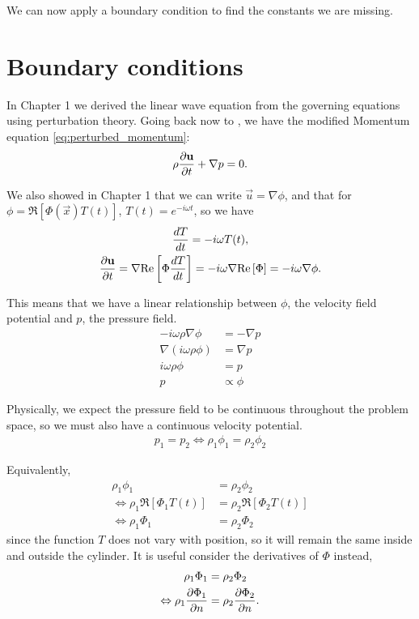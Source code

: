 We can now apply a boundary condition to find the constants we are missing.
%
%
\section{Boundary conditions}

In Chapter 1 we derived the linear wave equation from the governing equations using perturbation theory. Going back now to , we have the modified Momentum equation \eqref{eq:perturbed_momentum}:
\begin{equation*}
  \rho \frac{\partial \mathbf{u}}{\partial t} + \nabla p = 0.
\end{equation*}

We also showed in Chapter 1 that we can write $\vec{u} = \nabla \phi$, and that for $\phi = \Re[\Phi(\vec{x})T(t)]$, $T(t)=e^{-i\omega t}$, so we have
\begin{gather*}
  \frac{dT}{dt} = - i\omega T(t), \\
  \frac{\partial \mathbf{u}}{\partial t} = \nabla \text{Re}\left[\Phi \frac{dT}{dt} \right]
  = -i \omega \nabla \text{Re}\left[ \Phi \right] = -i \omega \nabla \phi.
\end{gather*}

This means that we have a linear relationship between $\phi$, the velocity field potential and $p$, the pressure field.
\begin{align*}
  -i \omega \rho \nabla \phi &= - \nabla p \\
  \nabla (i \omega \rho \phi) &= \nabla p \\
  i \omega \rho \phi &= p \\
  p &\propto \phi
\end{align*}

Physically, we expect the pressure field to be continuous throughout the problem space, so we must also have a continuous velocity potential.
\begin{align*}
  p_1 = p_2 \Leftrightarrow \rho_1 \phi_1 = \rho_2 \phi_2
\end{align*}

Equivalently,
\begin{align*}
  \rho_1 \phi_1 &= \rho_2 \phi_2 \\
  \Leftrightarrow \rho_1 \Re[ \Phi_1 T(t) ] &= \rho_2 \Re[ \Phi_2 T(t) ] \\
  \Leftrightarrow \rho_1 \Phi_1 &= \rho_2 \Phi_2
\end{align*}
since the function $T$ does not vary with position, so it will remain the same inside and outside the cylinder. It is useful consider the derivatives of $\Phi$
instead,
\begin{align*}
  \rho_1 \Phi_1 &= \rho_2 \Phi_2 \\
  \Leftrightarrow \rho_1 \frac{\partial \Phi_1}{\partial n} &= \rho_2 \frac{\partial \Phi_2}{\partial n}.
\end{align*}

